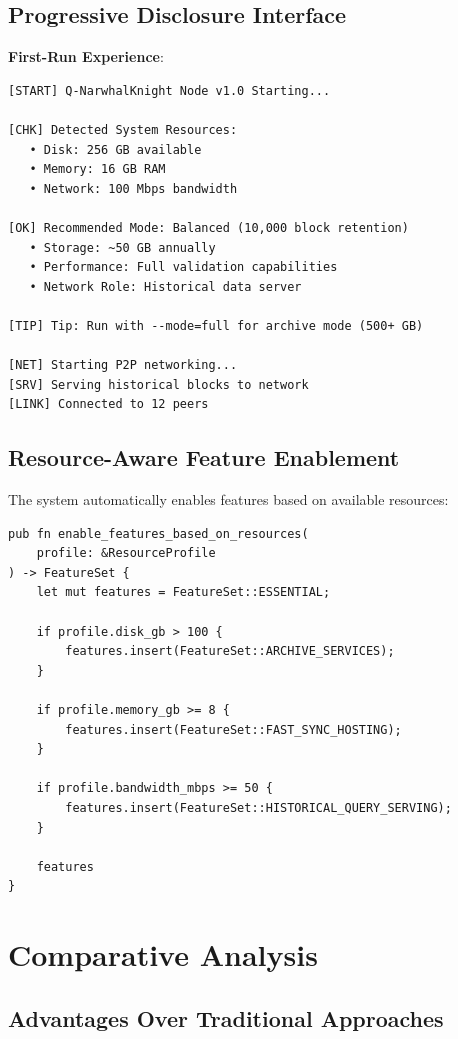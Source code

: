 \documentclass[11pt,a4paper]{article}
\begin{document}
\subsection{Progressive Disclosure Interface}

\textbf{First-Run Experience}:

\begin{verbatim}
[START] Q-NarwhalKnight Node v1.0 Starting...

[CHK] Detected System Resources:
   • Disk: 256 GB available
   • Memory: 16 GB RAM
   • Network: 100 Mbps bandwidth

[OK] Recommended Mode: Balanced (10,000 block retention)
   • Storage: ~50 GB annually
   • Performance: Full validation capabilities
   • Network Role: Historical data server

[TIP] Tip: Run with --mode=full for archive mode (500+ GB)

[NET] Starting P2P networking...
[SRV] Serving historical blocks to network
[LINK] Connected to 12 peers
\end{verbatim}

\subsection{Resource-Aware Feature Enablement}

The system automatically enables features based on available resources:

\begin{lstlisting}
pub fn enable_features_based_on_resources(
    profile: &ResourceProfile
) -> FeatureSet {
    let mut features = FeatureSet::ESSENTIAL;

    if profile.disk_gb > 100 {
        features.insert(FeatureSet::ARCHIVE_SERVICES);
    }

    if profile.memory_gb >= 8 {
        features.insert(FeatureSet::FAST_SYNC_HOSTING);
    }

    if profile.bandwidth_mbps >= 50 {
        features.insert(FeatureSet::HISTORICAL_QUERY_SERVING);
    }

    features
}
\end{lstlisting}

\section{Comparative Analysis}

\subsection{Advantages Over Traditional Approaches}
\end{document}
